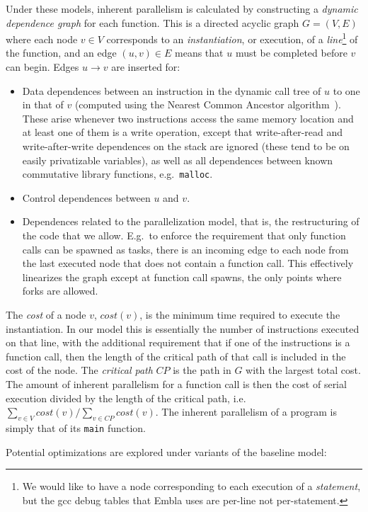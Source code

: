 Under these models, inherent parallelism is calculated by constructing a \emph{dynamic dependence graph} for each function.
This is a directed acyclic graph $G=(V,E)$ where each node $v\in V$ corresponds to an \emph{instantiation},
or execution, of a \emph{line}\footnote{We would like to have a node corresponding to each execution of a \emph{statement}, but the gcc debug tables that Embla uses are per-line not per-statement.} of the function,
and an edge $(u,v)\in E$ means that $u$ must be completed before $v$ can begin.
Edges $u \rightarrow v$ are inserted for:
\begin{itemize}
\item
Data dependences between an instruction in the dynamic call tree of $u$ to one in that of $v$ (computed using the Nearest Common Ancestor algorithm~\cite{embla:08}).
These arise whenever two instructions access the same memory location and at least one of them is a write operation,
except that write-after-read and write-after-write dependences on the stack are ignored (these tend to be on easily privatizable variables),
as well as all dependences between known commutative library functions, e.g.\ \texttt{malloc}.
\item
Control dependences between $u$ and $v$.
\item
Dependences related to the parallelization model, that is, the restructuring of the code that we allow.
E.g.\ to enforce the requirement that only function calls can be spawned as tasks, there is an incoming edge to each node from the last executed node that does not contain a function call.
This effectively linearizes the graph except at function call spawns, the only points where forks are allowed.
\end{itemize} 
The \emph{cost} of a node $v$, $\mathit{cost}(v)$,
is the minimum time required to execute the instantiation.
In our model this is essentially the number of instructions executed on that line,
with the additional requirement that if one of the instructions is a function call,
then the length of the critical path of that call is included in the cost of the node.
The \emph{critical path} $\mathit{CP}$ is the path in $G$ with the largest total cost.
The amount of inherent parallelism for a function call is then the cost of serial execution divided by the length of the critical path,
i.e. $\sum_{v\in V} \mathit{cost}(v)/\sum_{v\in \mathit{CP}} \mathit{cost}(v)$.
The inherent parallelism of a program is simply that of its \texttt{main} function.

Potential optimizations are explored under variants of the baseline model:

